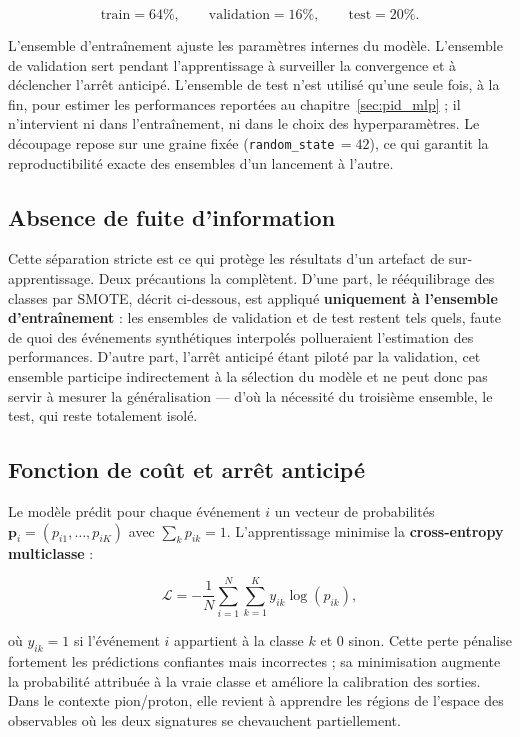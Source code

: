 \[
\text{train} = 64\%, \qquad
\text{validation} = 16\%, \qquad
\text{test} = 20\%.
\]

L'ensemble d'entraînement ajuste les paramètres internes du modèle. L'ensemble de validation sert pendant l'apprentissage à surveiller la convergence et à déclencher l'arrêt anticipé. L'ensemble de test n'est utilisé qu'une seule fois, à la fin, pour estimer les performances reportées au chapitre~\ref{sec:pid_mlp} ; il n'intervient ni dans l'entraînement, ni dans le choix des hyperparamètres. Le découpage repose sur une graine fixée (\texttt{random\_state}\(\,=42\)), ce qui garantit la reproductibilité exacte des ensembles d'un lancement à l'autre.

\subsection*{Absence de fuite d'information}

Cette séparation stricte est ce qui protège les résultats d'un artefact de sur-apprentissage. Deux précautions la complètent. D'une part, le rééquilibrage des classes par SMOTE, décrit ci-dessous, est appliqué \textbf{uniquement à l'ensemble d'entraînement} : les ensembles de validation et de test restent tels quels, faute de quoi des événements synthétiques interpolés pollueraient l'estimation des performances. D'autre part, l'arrêt anticipé étant piloté par la validation, cet ensemble participe indirectement à la sélection du modèle et ne peut donc pas servir à mesurer la généralisation — d'où la nécessité du troisième ensemble, le test, qui reste totalement isolé.

\subsection*{Fonction de coût et arrêt anticipé}

Le modèle prédit pour chaque événement \(i\) un vecteur de probabilités \(\mathbf{p}_i = (p_{i1},\dots,p_{iK})\) avec \(\sum_k p_{ik}=1\). L'apprentissage minimise la \textbf{cross-entropy multiclasse} :

\[
\mathcal{L}
=
-\frac{1}{N}
\sum_{i=1}^{N}
\sum_{k=1}^{K}
y_{ik}\log(p_{ik}),
\]

où \(y_{ik}=1\) si l'événement \(i\) appartient à la classe \(k\) et \(0\) sinon. Cette perte pénalise fortement les prédictions confiantes mais incorrectes ; sa minimisation augmente la probabilité attribuée à la vraie classe et améliore la calibration des sorties. Dans le contexte pion/proton, elle revient à apprendre les régions de l'espace des observables où les deux signatures se chevauchent partiellement.

